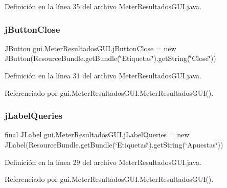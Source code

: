Definición en la línea 35 del archivo Meter\+Resultados\+G\+U\+I.\+java.

\mbox{\label{classgui_1_1MeterResultadosGUI_a18640ba21118837b12dd167366965f57}} 
\subsubsection{\texorpdfstring{jButtonClose}{jButtonClose}}
{\footnotesize\ttfamily J\+Button gui.\+Meter\+Resultados\+G\+U\+I.\+j\+Button\+Close = new J\+Button(Resource\+Bundle.\+get\+Bundle(\char`\"{}Etiquetas\char`\"{}).get\+String(\char`\"{}Close\char`\"{}))\hspace{0.3cm}{\ttfamily [private]}}



Definición en la línea 31 del archivo Meter\+Resultados\+G\+U\+I.\+java.



Referenciado por gui.\+Meter\+Resultados\+G\+U\+I.\+Meter\+Resultados\+G\+U\+I().

\mbox{\label{classgui_1_1MeterResultadosGUI_a7b346c03a4e3e6e9b6a4b280a73da693}} 
\subsubsection{\texorpdfstring{jLabelQueries}{jLabelQueries}}
{\footnotesize\ttfamily final J\+Label gui.\+Meter\+Resultados\+G\+U\+I.\+j\+Label\+Queries = new J\+Label(Resource\+Bundle.\+get\+Bundle(\char`\"{}Etiquetas\char`\"{}).get\+String(\char`\"{}Apuestas\char`\"{}))\hspace{0.3cm}{\ttfamily [private]}}



Definición en la línea 29 del archivo Meter\+Resultados\+G\+U\+I.\+java.



Referenciado por gui.\+Meter\+Resultados\+G\+U\+I.\+Meter\+Resultados\+G\+U\+I().

\mbox{\label{classgui_1_1MeterResultadosGUI_a1dbee32fc39f903b2a5cdbb09301368f}} 

